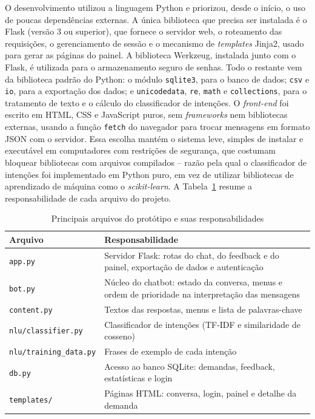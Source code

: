 \documentclass[12pt]{article}
\begin{document}
O desenvolvimento utilizou a linguagem Python e priorizou, desde o início, o
uso de poucas dependências externas. A única biblioteca que precisa ser
instalada é o Flask (versão 3 ou superior), que fornece o servidor web, o
roteamento das requisições, o gerenciamento de sessão e o mecanismo de
\textit{templates} Jinja2, usado para gerar as páginas do painel. A biblioteca
Werkzeug, instalada junto com o Flask, é utilizada para o armazenamento seguro
de senhas. Todo o restante vem da biblioteca padrão do Python: o módulo
\texttt{sqlite3}, para o banco de dados; \texttt{csv} e \texttt{io}, para a
exportação dos dados; e \texttt{unicodedata}, \texttt{re}, \texttt{math} e
\texttt{collections}, para o tratamento de texto e o cálculo do classificador
de intenções. O \textit{front-end} foi escrito em HTML, CSS e JavaScript puros,
sem \textit{frameworks} nem bibliotecas externas, usando a função
\texttt{fetch} do navegador para trocar mensagens em formato JSON com o
servidor. Essa escolha mantém o sistema leve, simples de instalar e executável
em computadores com restrições de segurança, que costumam bloquear bibliotecas
com arquivos compilados -- razão pela qual o classificador de intenções foi
implementado em Python puro, em vez de utilizar bibliotecas de aprendizado de
máquina como o \textit{scikit-learn}. A Tabela~\ref{tab:modulos} resume a
responsabilidade de cada arquivo do projeto.

\begin{table}[H]
  \centering
  \begin{tabular}{|p{}|p{}|}
    \hline
    \textbf{Arquivo} & \textbf{Responsabilidade} \\ \hline
    \texttt{app.py} & Servidor Flask: rotas do chat, do feedback e do painel,
    exportação de dados e autenticação \\ \hline
    \texttt{bot.py} & Núcleo do chatbot: estado da conversa, menus e ordem de
    prioridade na interpretação das mensagens \\ \hline
    \texttt{content.py} & Textos das respostas, menus e lista de palavras-chave \\ \hline
    \texttt{nlu/classifier.py} & Classificador de intenções (TF-IDF e
    similaridade de cosseno) \\ \hline
    \texttt{nlu/training\_data.py} & Frases de exemplo de cada intenção \\ \hline
    \texttt{db.py} & Acesso ao banco SQLite: demandas, feedback, estatísticas e
    login \\ \hline
    \texttt{templates/} & Páginas HTML: conversa, login, painel e detalhe da
    demanda \\ \hline
  \end{tabular}
  \caption{Principais arquivos do protótipo e suas responsabilidades}
  \label{tab:modulos}
\end{table}
\end{document}
